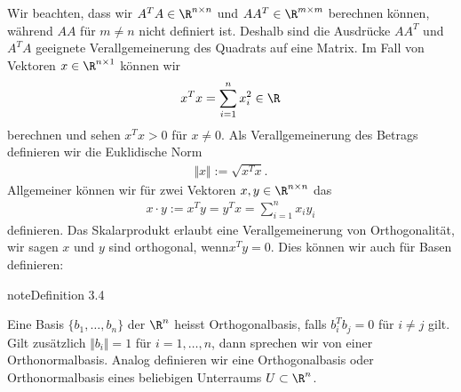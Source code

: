\documentclass[letterpaper,10pt,english]{jupyterBook}
\begin{document}
Wir beachten, dass wir \(A^T A \in \R^{n \times n}\) und \(AA^T \in \R^{m \times m}\) berechnen können, während \(A A \) für \(m \neq n\) nicht definiert ist. Deshalb sind die Ausdrücke \(AA^T\) und \(A^T A\)  geeignete Verallgemeinerung des Quadrats auf eine Matrix. Im Fall von Vektoren \(x \in \R^{n \times 1}\) können wir
\begin{equation*}
\begin{split} x^T x = \sum_{i=1}^n x_i^2 \in \R\end{split}
\end{equation*}
berechnen und sehen \(x^T x > 0\) für \(x \neq 0.\)  Als Verallgemeinerung des Betrags definieren wir die Euklidische Norm
\begin{equation*}
\begin{split} \Vert x \Vert := \sqrt{x^T x}.\end{split}
\end{equation*}
Allgemeiner können wir für zwei Vektoren \(x,y \in \R^{n \times n}\) das 
\begin{equation*}
\begin{split} x \cdot y := x^T y = y^T x =  \sum_{i=1}^n x_i y_i\end{split}
\end{equation*}
definieren. Das Skalarprodukt erlaubt eine Verallgemeinerung von Orthogonalität, wir sagen \(x\) und \(y\) sind orthogonal, wenn\( x^T y  = 0.\) Dies können wir auch für Basen definieren:
\label{vektorraeume/LGS:definition-4}
\begin{sphinxadmonition}{note}{Definition 3.4}



Eine Basis \(\{b_1,\ldots,b_n\}\) der \(\R^n\) heisst Orthogonalbasis, falls \(b_i^T b_j = 0\) für \(i \neq j\) gilt. Gilt zusätzlich \(\Vert b_i \Vert=1\) für \(i=1,\ldots,n\), dann sprechen wir von einer Orthonormalbasis. Analog definieren wir eine Orthogonalbasis oder Orthonormalbasis eines beliebigen Unterraums \(U \subset \R^n\).
\end{sphinxadmonition}
\end{document}
